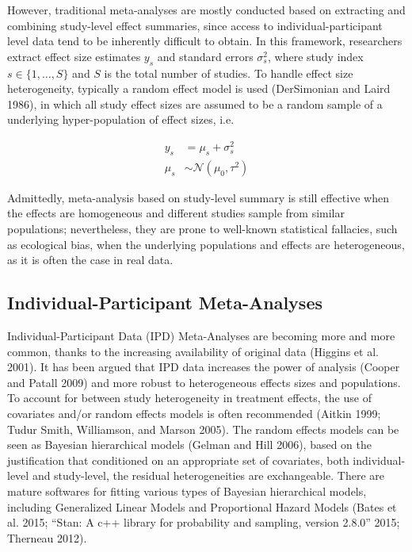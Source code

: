 However, traditional meta-analyses are mostly conducted based on
extracting and combining study-level effect summaries, since access to
individual-participant level data tend to be inherently difficult to
obtain. In this framework, researchers extract effect size estimates
\(y_s\) and standard errors \(\sigma_s^2\), where study index
\(s\in \{1,\ldots,S\}\) and \(S\) is the total number of studies. To
handle effect size heterogeneity, typically a random effect model is
used (DerSimonian and Laird 1986), in which all study effect sizes are
assumed to be a random sample of a underlying hyper-population of effect
sizes, i.e.

\begin{align*}
    y_s&=\mu_s + \sigma_s^2\\
    \mu_s &\sim \mathcal{N}(\mu_0, \tau^2)
\end{align*}

\noindent Admittedly, meta-analysis based on study-level summary is
still effective when the effects are homogeneous and different studies
sample from similar populations; nevertheless, they are prone to
well-known statistical fallacies, such as ecological bias, when the
underlying populations and effects are heterogeneous, as it is often the
case in real data.

\subsection{Individual-Participant
Meta-Analyses}\label{individual-participant-meta-analyses}

Individual-Participant Data (IPD) Meta-Analyses are becoming more and
more common, thanks to the increasing availability of original data
(Higgins et al. 2001). It has been argued that IPD data increases the
power of analysis (Cooper and Patall 2009) and more robust to
heterogeneous effects sizes and populations. To account for between
study heterogeneity in treatment effects, the use of covariates and/or
random effects models is often recommended (Aitkin 1999; Tudur Smith,
Williamson, and Marson 2005). The random effects models can be seen as
Bayesian hierarchical models (Gelman and Hill 2006), based on the
justification that conditioned on an appropriate set of covariates, both
individual-level and study-level, the residual heterogeneities are
exchangeable. There are mature softwares for fitting various types of
Bayesian hierarchical models, including Generalized Linear Models and
Proportional Hazard Models (Bates et al. 2015; ``Stan: A c++ library for
probability and sampling, version 2.8.0'' 2015; Therneau 2012).

